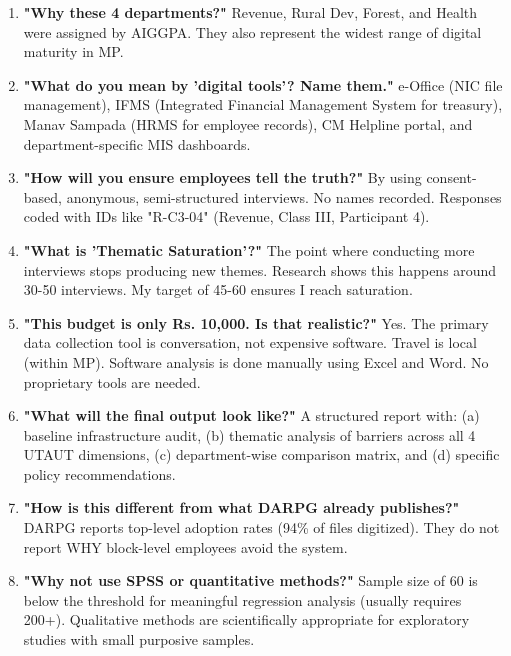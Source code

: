 \documentclass[11pt,a4paper]{article}
\begin{document}
\begin{enumerate}[itemsep=8pt]
    \item \textbf{"Why these 4 departments?"} Revenue, Rural Dev, Forest, and Health were assigned by AIGGPA. They also represent the widest range of digital maturity in MP.

    \item \textbf{"What do you mean by 'digital tools'? Name them."} e-Office (NIC file management), IFMS (Integrated Financial Management System for treasury), Manav Sampada (HRMS for employee records), CM Helpline portal, and department-specific MIS dashboards.

    \item \textbf{"How will you ensure employees tell the truth?"} By using consent-based, anonymous, semi-structured interviews. No names recorded. Responses coded with IDs like "R-C3-04" (Revenue, Class III, Participant 4).

    \item \textbf{"What is 'Thematic Saturation'?"} The point where conducting more interviews stops producing new themes. Research shows this happens around 30-50 interviews. My target of 45-60 ensures I reach saturation.

    \item \textbf{"This budget is only Rs. 10,000. Is that realistic?"} Yes. The primary data collection tool is conversation, not expensive software. Travel is local (within MP). Software analysis is done manually using Excel and Word. No proprietary tools are needed.

    \item \textbf{"What will the final output look like?"} A structured report with: (a) baseline infrastructure audit, (b) thematic analysis of barriers across all 4 UTAUT dimensions, (c) department-wise comparison matrix, and (d) specific policy recommendations.

    \item \textbf{"How is this different from what DARPG already publishes?"} DARPG reports top-level adoption rates (94\% of files digitized). They do not report WHY block-level employees avoid the system.

    \item \textbf{"Why not use SPSS or quantitative methods?"} Sample size of 60 is below the threshold for meaningful regression analysis (usually requires 200+). Qualitative methods are scientifically appropriate for exploratory studies with small purposive samples.


\end{enumerate}
\end{document}
